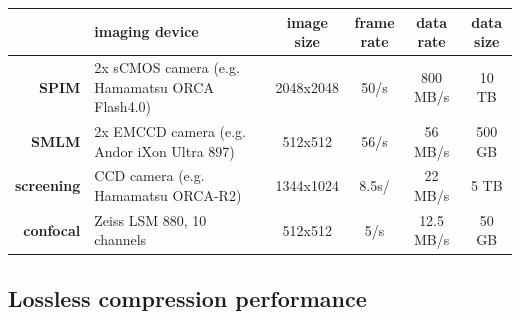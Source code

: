     \begin{table}[tbp]
      \begin{small}
        \renewcommand{\arraystretch}{2}
        \centering
        \begin{tabular}{rp{5cm}cccc}
            & \textbf{imaging device} & \textbf{image size} &  \parbox[c]{1.2cm}{\textbf{frame}\\ \textbf{rate}} & \textbf{data rate} & \parbox[c]{1.2cm}{\textbf{data\\ size}} \\
            \hline
            \hline
            \textbf{SPIM} & 2x sCMOS camera (e.g. Hamamatsu ORCA Flash4.0) & 2048x2048 & 50/s & 800 MB/s & 10 TB \\ \hline
            \textbf{SMLM} & 2x EMCCD camera (e.g. Andor iXon Ultra 897) & 512x512 & 56/s & 56 MB/s & 500 GB \\ \hline
            \textbf{screening} & CCD camera (e.g. Hamamatsu ORCA-R2) & 1344x1024 & 8.5s/ & 22 MB/s & 5 TB \\ \hline
            \textbf{confocal} & Zeiss LSM 880, 10 channels & 512x512 & 5/s & 12.5 MB/s & 50 GB \\ 
        \end{tabular}
        \label{tab:sizes}
      \end{small}
    \end{table}

  \subsection{Lossless compression performance}

